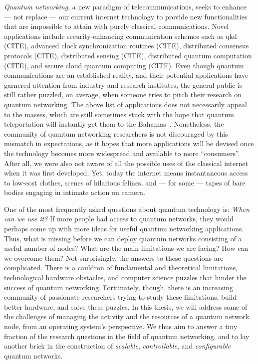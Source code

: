 \begin{refsection}
\emph{Quantum networking}, a new paradigm of telecommunications, seeks to enhance --- not replace
--- our current internet technology to provide new functionalities that are impossible to attain
with purely classical communications. Novel applications include security-enhancing communication
schemes such as \acrfull{qkd} (CITE), advanced clock synchronization routines (CITE), distributed
consensus protocols (CITE), distributed sensing (CITE), distributed quantum computation (CITE), and
secure cloud quantum computing (CITE). Even though quantum communications are an established
reality, and their potential applications have garnered attention from industry and research
institutes, the general public is still rather puzzled, on average, when someone tries to pitch
their research on quantum networking. The above list of applications does not necessarily appeal to
the masses, which are still sometimes stuck with the hope that quantum teleportation will instantly
get them to the Bahamas~\cite{xkcd_teleportation}. Nonetheless, the community of quantum networking
researchers is not discouraged by this mismatch in expectations, as it hopes that more applications
will be devised once the technology becomes more widespread and available to more ``consumers''.
After all, we were also not aware of all the possible uses of the classical internet when it was
first developed. Yet, today the internet means instantaneous access to low-cost clothes, scenes of
hilarious felines, and --- for some --- tapes of bare bodies engaging in intimate action on camera.

One of the most frequently asked questions about quantum technology is: \emph{When can we use it?}
If more people had access to quantum networks, they would perhaps come up with more ideas for useful
quantum networking applications. Thus, what is missing before we can deploy quantum networks
consisting of a useful number of nodes? What are the main limitations we are facing? How can we
overcome them? Not surprisingly, the answers to these questions are complicated. There is a cauldron
of fundamental and theoretical limitations, technological hardware obstacles, and computer science
puzzles that hinder the success of quantum networking. Fortunately, though, there is an increasing
community of passionate researchers trying to study these limitations, build better hardware, and
solve these puzzles. In this thesis, we will address some of the challenges of managing the activity
and the resources of a quantum network node, from an operating system's perspective. We thus aim to
answer a tiny fraction of the research questions in the field of quantum networking, and to lay
another brick in the construction of \emph{scalable}, \emph{controllable}, and \emph{configurable}
quantum networks.


\end{refsection}
